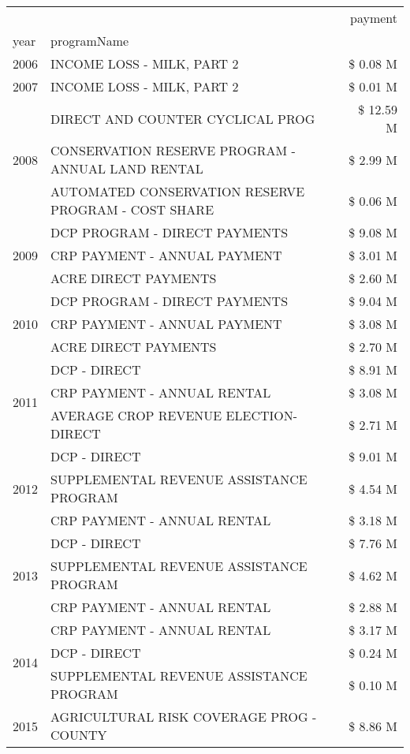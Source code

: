 \begin{tabular}{llr}
\toprule
 &  & payment \\
year & programName &  \\
\midrule
2006 & INCOME LOSS - MILK, PART 2 & \$ 0.08 M \\
\cline{1-3}
2007 & INCOME LOSS - MILK, PART 2 & \$ 0.01 M \\
\cline{1-3}
\multirow[t]{3}{*}{2008} & DIRECT AND COUNTER CYCLICAL PROG & \$ 12.59 M \\
 & CONSERVATION RESERVE PROGRAM - ANNUAL LAND RENTAL & \$ 2.99 M \\
 & AUTOMATED CONSERVATION RESERVE PROGRAM - COST SHARE & \$ 0.06 M \\
\cline{1-3}
\multirow[t]{3}{*}{2009} & DCP PROGRAM - DIRECT PAYMENTS & \$ 9.08 M \\
 & CRP PAYMENT - ANNUAL PAYMENT & \$ 3.01 M \\
 & ACRE DIRECT PAYMENTS & \$ 2.60 M \\
\cline{1-3}
\multirow[t]{3}{*}{2010} & DCP PROGRAM - DIRECT PAYMENTS & \$ 9.04 M \\
 & CRP PAYMENT - ANNUAL PAYMENT & \$ 3.08 M \\
 & ACRE DIRECT PAYMENTS & \$ 2.70 M \\
\cline{1-3}
\multirow[t]{3}{*}{2011} & DCP - DIRECT & \$ 8.91 M \\
 & CRP PAYMENT - ANNUAL RENTAL & \$ 3.08 M \\
 & AVERAGE CROP REVENUE ELECTION-DIRECT & \$ 2.71 M \\
\cline{1-3}
\multirow[t]{3}{*}{2012} & DCP - DIRECT & \$ 9.01 M \\
 & SUPPLEMENTAL REVENUE ASSISTANCE PROGRAM & \$ 4.54 M \\
 & CRP PAYMENT - ANNUAL RENTAL & \$ 3.18 M \\
\cline{1-3}
\multirow[t]{3}{*}{2013} & DCP - DIRECT & \$ 7.76 M \\
 & SUPPLEMENTAL REVENUE ASSISTANCE PROGRAM & \$ 4.62 M \\
 & CRP PAYMENT - ANNUAL RENTAL & \$ 2.88 M \\
\cline{1-3}
\multirow[t]{3}{*}{2014} & CRP PAYMENT - ANNUAL RENTAL & \$ 3.17 M \\
 & DCP - DIRECT & \$ 0.24 M \\
 & SUPPLEMENTAL REVENUE ASSISTANCE PROGRAM & \$ 0.10 M \\
\cline{1-3}
\multirow[t]{3}{*}{2015} & AGRICULTURAL RISK COVERAGE PROG - COUNTY & \$ 8.86 M \\

\end{tabular}
